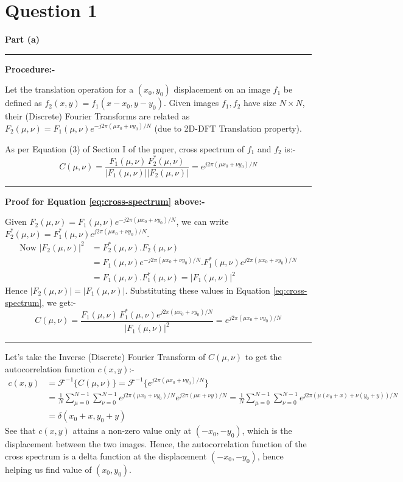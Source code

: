 \documentclass[a4paper,12pt]{article}
\title{\cooltitle{CS663 Assignment-5}}
\author{{\bf Saksham Rathi, Kavya Gupta, Shravan Srinivasa Raghavan} \\
\small Department of Computer Science, \\
Indian Institute of Technology Bombay \\}
\date{}
\newenvironment{solution}[2][]{%
\begin{mdframed}[linecolor=blue!70!black, linewidth=2pt, roundcorner=10pt, backgroundcolor=yellow!10!white, skipabove=12pt, skipbelow=12pt]%
	\textbf{\large #2}
	\par\noindent\rule{\textwidth}{0.4pt}
}{
\end{mdframed}
}
\begin{document}
\maketitle

\section*{Question 1}
\begin{solution}{Part (a)}
\textbf{\Large Procedure:-}

Let the translation operation for a $(x_0, y_0)$ displacement on an image $f_1$ be defined as $f_2(x, y) = f_1(x - x_0, y - y_0)$. Given images $f_1, f_2$ have size $N \times N$, their (Discrete) Fourier Transforms are related as $F_2(\mu, \nu) = F_1(\mu, \nu) e^{-j2\pi (\mu x_0 + \nu y_0)/N}$ (due to 2D-DFT Translation property).

As per Equation (3) of Section I of the paper, cross spectrum of $f_1$ and $f_2$ is:-
\begin{equation}
	C(\mu, \nu) = \frac{F_1(\mu, \nu) \, F_2^{*}(\mu, \nu)}{|F_1(\mu, \nu)||F_2(\mu, \nu)|} = e^{j2\pi (\mu x_0 + \nu y_0)/N}
	\label{eq:cross-spectrum}
\end{equation}

\hrule
\vspace{5pt}
\textbf{Proof for Equation \ref{eq:cross-spectrum} above:-}

Given $F_2(\mu, \nu) = F_1(\mu, \nu) e^{-j2\pi (\mu x_0 + \nu y_0)/N}$, we can write $F_2^{*}(\mu, \nu) = F_1^{*}(\mu, \nu) e^{j2\pi (\mu x_0 + \nu y_0)/N}$.
\begin{align*}
	\text{Now }|F_2(\mu, \nu)|^2 &= F_2^{*}(\mu, \nu) . F_2(\mu, \nu) \\
	&= F_1(\mu, \nu) e^{-j2\pi (\mu x_0 + \nu y_0)/N} . F_1^{*}(\mu, \nu) e^{j2\pi (\mu x_0 + \nu y_0)/N} \\
	&= F_1(\mu, \nu) . F_1^{*}(\mu, \nu) = |F_1(\mu, \nu)|^2
\end{align*}
Hence $|F_2(\mu, \nu)| = |F_1(\mu, \nu)|$. Substituting these values in Equation \ref{eq:cross-spectrum}, we get:-
\[C(\mu, \nu) = \frac{F_1(\mu, \nu) \, F_1^{*}(\mu, \nu) e^{j2\pi (\mu x_0 + \nu y_0)/N}}{|F_1(\mu, \nu)|^2} = e^{j2\pi (\mu x_0 + \nu y_0)/N}\]
\hrule
\vspace{5pt}
Let's take the Inverse (Discrete) Fourier Transform of $C(\mu, \nu)$ to get the autocorrelation function $c(x, y)$:-
\begin{align*}
	c(x, y) &= \mathcal{F}^{-1}\{C(\mu, \nu)\} = \mathcal{F}^{-1}\{e^{j2\pi (\mu x_0 + \nu y_0)/N}\} \\
	&= \frac{1}{N} \sum_{\mu=0}^{N-1} \sum_{\nu=0}^{N-1} e^{j2\pi (\mu x_0 + \nu y_0)/N} e^{j2\pi (\mu x + \nu y)/N} = \frac{1}{N} \sum_{\mu=0}^{N-1} \sum_{\nu=0}^{N-1} e^{j2\pi (\mu (x_0 + x) + \nu (y_0 + y))/N} \\
	&= \delta(x_0 + x, y_0 + y)
\end{align*}
See that $c(x,y)$ attains a non-zero value only at $(-x_0, -y_0)$, which is the displacement between the two images. Hence, the autocorrelation function of the cross spectrum is a delta function at the displacement $(-x_0, -y_0)$, hence helping us find value of $(x_0, y_0)$.


\end{solution}
\end{document}
